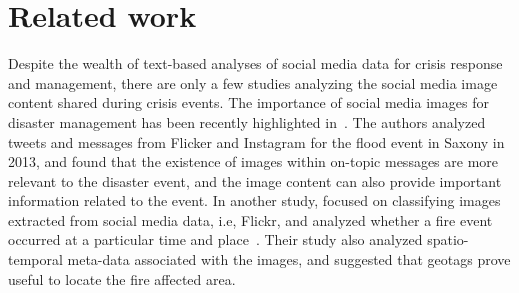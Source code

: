 \documentclass{iscram}
\begin{document}
\section{Related work}%

Despite the wealth of text-based analyses of social media data for crisis response and management, there are only a few studies analyzing the social media image content shared during crisis events.
The importance of social media images for disaster management has been recently highlighted in~\parencite{petersinvestigating}.
The authors analyzed tweets and messages from Flicker and Instagram for the flood event in Saxony in 2013, and found that the existence of images within on-topic messages are more relevant to the disaster event, and the image content can also provide important information related to the event.
In another study, \citeauthor{daly2016mining} focused on classifying images extracted from social media data, i.e, Flickr, and analyzed whether a fire event occurred at a particular time and place~\parencite{daly2016mining}. Their study also analyzed spatio-temporal meta-data associated with the images, and suggested that geotags prove useful to locate the fire affected area.
\end{document}
